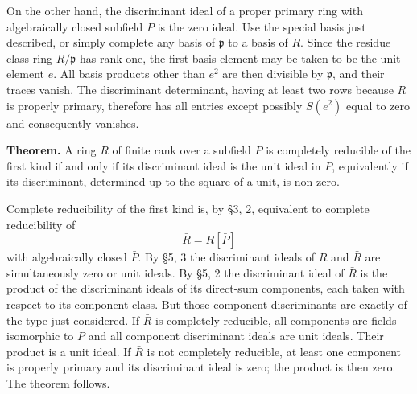 \documentclass[11pt]{article}
\begin{document}
On the other hand, the discriminant ideal of a proper primary ring with
algebraically closed subfield \(P\) is the zero ideal. Use the special
basis just described, or simply complete any basis of \(\mathfrak p\) to
a basis of \(R\). Since the residue class ring \(R/\mathfrak p\) has
rank one, the first basis element may be taken to be the unit element
\(e\). All basis products other than \(e^2\) are then divisible by
\(\mathfrak p\), and their traces vanish. The discriminant determinant,
having at least two rows because \(R\) is properly primary, therefore
has all entries except possibly \(S(e^2)\) equal to zero and
consequently vanishes.

\textbf{Theorem.} A ring \(R\) of finite rank over a subfield \(P\) is
completely reducible of the first kind if and only if its discriminant
ideal is the unit ideal in \(P\), equivalently if its discriminant,
determined up to the square of a unit, is non-zero.

Complete reducibility of the first kind is, by §3, 2, equivalent to
complete reducibility of \[
  \bar R=R[\bar P]
\] with algebraically closed \(\bar P\). By §5, 3 the discriminant
ideals of \(R\) and \(\bar R\) are simultaneously zero or unit ideals.
By §5, 2 the discriminant ideal of \(\bar R\) is the product of the
discriminant ideals of its direct-sum components, each taken with
respect to its component class. But those component discriminants are
exactly of the type just considered. If \(\bar R\) is completely
reducible, all components are fields isomorphic to \(\bar P\) and all
component discriminant ideals are unit ideals. Their product is a unit
ideal. If \(\bar R\) is not completely reducible, at least one component
is properly primary and its discriminant ideal is zero; the product is
then zero. The theorem follows.
\end{document}
